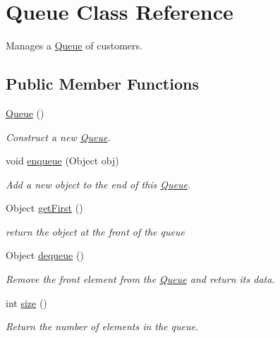 \hypertarget{class_queue}{
\section{Queue Class Reference}
\label{class_queue}
}
Manages a \hyperlink{class_queue}{Queue} of customers.  


\subsection*{Public Member Functions}
\begin{CompactItemize}
\item 
\hypertarget{class_queue_7cfca3637d57c4a9e37351b3426ffd40}{
\hyperlink{class_queue_7cfca3637d57c4a9e37351b3426ffd40}{Queue} ()}
\label{class_queue_7cfca3637d57c4a9e37351b3426ffd40}

\begin{CompactList}\small\item\em Construct a new \hyperlink{class_queue}{Queue}. \item\end{CompactList}\item 
void \hyperlink{class_queue_f307abf6ecbc2033ca3273335cddf0bf}{enqueue} (Object obj)
\begin{CompactList}\small\item\em Add a new object to the end of this \hyperlink{class_queue}{Queue}. \item\end{CompactList}\item 
\hypertarget{class_queue_0c24ca74a17454e2480a60552ae62aa1}{
Object \hyperlink{class_queue_0c24ca74a17454e2480a60552ae62aa1}{getFirst} ()}
\label{class_queue_0c24ca74a17454e2480a60552ae62aa1}

\begin{CompactList}\small\item\em return the object at the front of the queue \item\end{CompactList}\item 
\hypertarget{class_queue_e501d90b118588ab012f99f2d3861422}{
Object \hyperlink{class_queue_e501d90b118588ab012f99f2d3861422}{dequeue} ()}
\label{class_queue_e501d90b118588ab012f99f2d3861422}

\begin{CompactList}\small\item\em Remove the front element from the \hyperlink{class_queue}{Queue} and return its data. \item\end{CompactList}\item 
int \hyperlink{class_queue_04035df1270c73e08ca1fa7eb267d9b8}{size} ()
\begin{CompactList}\small\item\em Return the number of elements in the queue. \item\end{CompactList}\end{CompactItemize}
